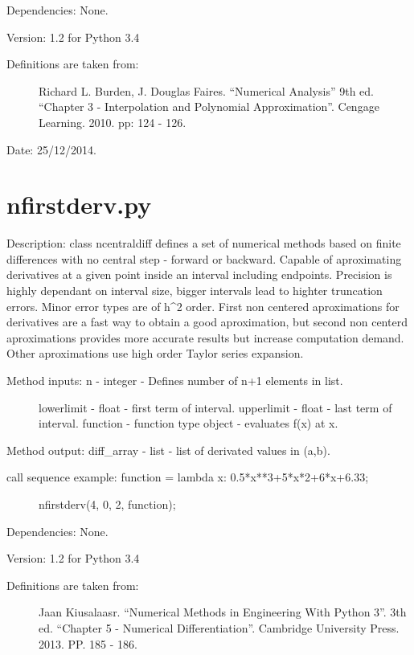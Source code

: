 \documentclass[letterpaper,10pt,oneside]{sphinxmanual}
\theoremstyle{plain}%
\theoremstyle{definition}%
\theoremstyle{remark}%
\begin{document}
Dependencies: None.

Version: 1.2 for Python 3.4
\begin{description}
\item[{Definitions are taken from:}] \leavevmode
Richard L. Burden, J. Douglas Faires. ``Numerical Analysis'' 9th ed.
``Chapter 3 - Interpolation and Polynomial Approximation''. 
Cengage Learning. 2010. pp: 124 - 126.

\end{description}




Date: 25/12/2014.


\section{nfirstderv.py}
\label{code:module-nfirstderv}\label{code:nfirstderv-py}
Description: class ncentraldiff defines a set of numerical methods based on
finite differences with no central step - forward or backward. Capable of
aproximating derivatives at a given point inside an interval including 
endpoints. Precision is highly dependant on interval size, bigger intervals
lead to highter truncation errors. Minor error types are of h\textasciicircum{}2 order. First
non centered aproximations for derivatives are a fast way to obtain a good
aproximation, but second non centerd aproximations provides more accurate
results but increase computation demand. Other aproximations use high order
Taylor series expansion.
\begin{description}
\item[{Method inputs: n - integer - Defines number of n+1 elements in list.}] \leavevmode
lowerlimit - float - first term of interval.
upperlimit - float - last term of interval.
function - function type object - evaluates f(x) at x.

\end{description}

Method output: diff\_array - list - list of derivated values in (a,b).
\begin{description}
\item[{call sequence example: function = lambda x: 0.5*x**3+5*x*2+6*x+6.33;}] \leavevmode
nfirstderv(4, 0, 2, function);

\end{description}

Dependencies: None.

Version: 1.2 for Python 3.4
\begin{description}
\item[{Definitions are taken from:}] \leavevmode
Jaan Kiusalaasr. ``Numerical Methods in Engineering With Python 3''.
3th ed. ``Chapter 5 - Numerical Differentiation''. 
Cambridge University Press. 2013. PP. 185 - 186.

\end{description}
\end{document}
